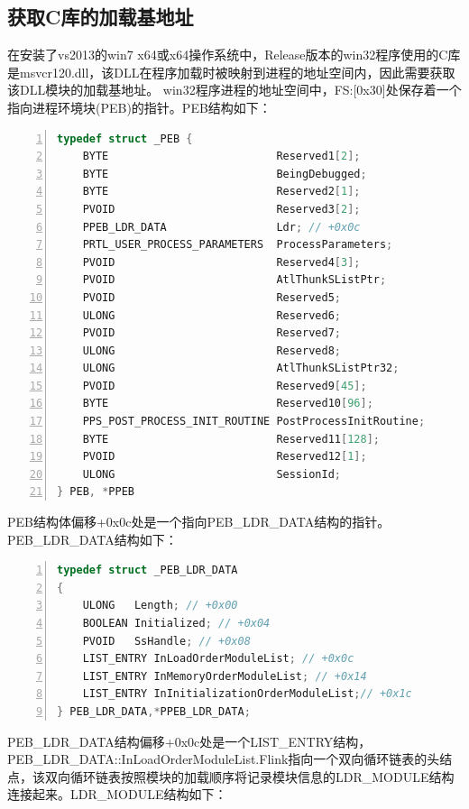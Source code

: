 \documentclass[bachelor]{thesis-uestc}
\begin{document}
\subsection{获取C库的加载基地址}
在安装了vs2013的win7 x64或x64操作系统中，Release版本的win32程序使用的C库是msvcr120.dll，该DLL在程序加载时被映射到进程的地址空间内，因此需要获取该DLL模块的加载基地址。
win32程序进程的地址空间中，FS:[0x30]处保存着一个指向进程环境块(PEB)的指针。PEB结构如下：

\begin{lstlisting}[language=C++, basicstyle=\ttfamily\tiny, numbers=left, numberstyle=\tiny, keywordstyle=\color{blue!70}, commentstyle=\color{red!50!green!50!blue!50}, frame=shadowbox, rulesepcolor=\color{red!20!green!20!blue!20}]
typedef struct _PEB {
	BYTE                          Reserved1[2];
	BYTE                          BeingDebugged;
	BYTE                          Reserved2[1];
	PVOID                         Reserved3[2];
	PPEB_LDR_DATA                 Ldr; // +0x0c 
	PRTL_USER_PROCESS_PARAMETERS  ProcessParameters;
	PVOID                         Reserved4[3];
	PVOID                         AtlThunkSListPtr;
	PVOID                         Reserved5;
	ULONG                         Reserved6;
	PVOID                         Reserved7;
	ULONG                         Reserved8;
	ULONG                         AtlThunkSListPtr32;
	PVOID                         Reserved9[45];
	BYTE                          Reserved10[96];
	PPS_POST_PROCESS_INIT_ROUTINE PostProcessInitRoutine;
	BYTE                          Reserved11[128];
	PVOID                         Reserved12[1];
	ULONG                         SessionId;
} PEB, *PPEB
\end{lstlisting}

PEB结构体偏移+0x0c处是一个指向PEB\_LDR\_DATA结构的指针。PEB\_LDR\_DATA结构如下：

\begin{lstlisting}[language=C++, basicstyle=\ttfamily\tiny, numbers=left, numberstyle=\tiny, keywordstyle=\color{blue!70}, commentstyle=\color{red!50!green!50!blue!50}, frame=shadowbox, rulesepcolor=\color{red!20!green!20!blue!20}]
typedef struct _PEB_LDR_DATA
{
	ULONG	Length; // +0x00
	BOOLEAN	Initialized; // +0x04
	PVOID	SsHandle; // +0x08
	LIST_ENTRY InLoadOrderModuleList; // +0x0c
	LIST_ENTRY InMemoryOrderModuleList; // +0x14
	LIST_ENTRY InInitializationOrderModuleList;// +0x1c
} PEB_LDR_DATA,*PPEB_LDR_DATA;
\end{lstlisting}

PEB\_LDR\_DATA结构偏移+0x0c处是一个LIST\_ENTRY结构，PEB\_LDR\_DATA::InLoadOrderModuleList.Flink指向一个双向循环链表的头结点，该双向循环链表按照模块的加载顺序将记录模块信息的LDR\_MODULE结构连接起来。LDR\_MODULE结构如下：
\end{document}
